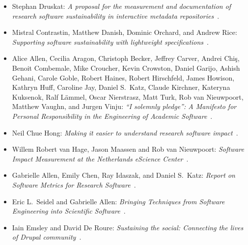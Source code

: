 \documentclass[11pt, oneside]{amsart}
\begin{document}
\begin{itemize}
    \item Stephan Druskat: \emph{A proposal for the measurement and
    documentation of research software sustainability in interactive metadata
    repositories}~\cite{Druskat:2016ws}.

    \item Mistral Contrastin, Matthew Danish,
    Dominic Orchard\textsuperscript{\textasteriskcentered}, and
    Andrew Rice: \emph{Supporting software sustainability with
    lightweight specifications}~\cite{Contrastin:2016ws}.

    \item Alice Allen, Cecilia Aragon, Christoph Becker, Jeffrey Carver,
    Andrei Chi\c{s}, Benoit Combemale, Mike Croucher, Kevin Crowston, Daniel Garijo,
    Ashish Gehani, Carole Goble\textsuperscript{\textasteriskcentered},
    Robert Haines, Robert Hirschfeld, James Howison,
    Kathryn Huff, Caroline Jay, Daniel S.~Katz, Claude Kirchner, Kateryna Kuksenok,
    Ralf L\"{a}mmel, Oscar Nierstrasz, Matt Turk, Rob van Nieuwpoort, Matthew Vaughn,
    and Jurgen Vinju: \emph{``I solemnly pledge'': A Manifesto for Personal
    Responsibility in the Engineering of Academic Software}~\cite{AAllen:2016ws}.

    \item Neil Chue Hong\textsuperscript{\textasteriskcentered}:
    \textit{Making it easier to understand research software impact}~\cite{ChueHong:2016wsb}.

    \item Willem Robert van Hage\textsuperscript{\textasteriskcentered},
    Jason Maassen and Rob van Nieuwpoort: \textit{Software Impact Measurement at the
    Netherlands eScience Center}~\cite{vanHage:2016ws}.

    \item Gabrielle Allen, Emily Chen\textsuperscript{\textasteriskcentered},
    Ray Idaszak, and Daniel S.\ Katz: \textit{Report on Software Metrics for
    Research Software}~\cite{GAllen:2016wsb}.

    \item Eric L.~Seidel\textsuperscript{\textasteriskcentered}
    and Gabrielle Allen: \textit{Bringing Techniques from Software Engineering
    into Scientific Software}~\cite{Seidel:2016ws}.

    \item Iain Emsley\textsuperscript{\textasteriskcentered} and David
    De Roure: \textit{Sustaining the social: Connecting the lives of Drupal
    community}~\cite{Emsley:2016ws}.


\end{itemize}
\end{document}
